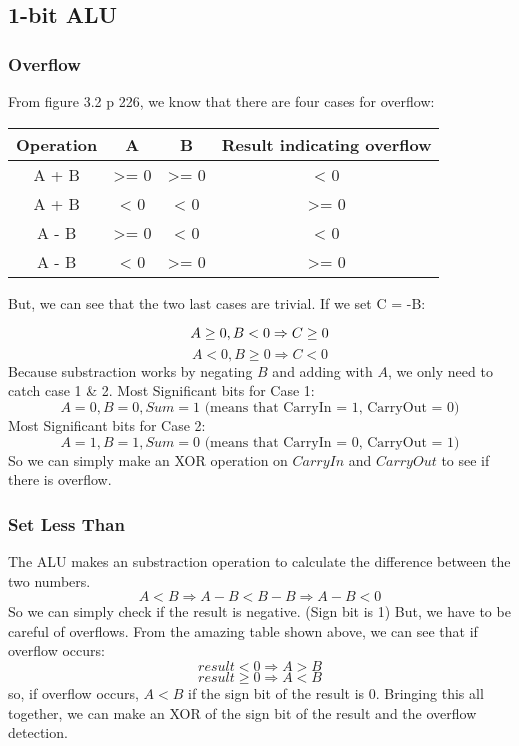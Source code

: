 \documentclass[11pt,a4paper]{article}
\begin{document}

\subsection*{1-bit ALU} %
\label{sub:1-bit_ALU}

\subsubsection*{Overflow}

From figure 3.2 p 226, we know that there are four cases for overflow:
\begin{table}[htb!]
    \centering
    \begin{tabular}{| c | c | c | c |}
        Operation & A & B & Result indicating overflow \\ \hline
        A + B & >= 0 & >= 0 & < 0 \\
        A + B & < 0 & < 0 & >= 0 \\
        A - B & >= 0 & < 0 & < 0 \\
        A - B & < 0 & >= 0 & >= 0 \\
    \end{tabular}
\end{table}

But, we can see that the two last cases are trivial. If we set C = -B:

\[
    A \geq 0, B < 0 \Rightarrow C \geq 0 \\
\]
\[
    A < 0, B \geq 0 \Rightarrow C < 0
\]
Because substraction works by negating $B$ and adding with $A$, we only need to
catch case 1 \& 2. Most Significant bits for Case 1:
\[
    A = 0, B = 0, Sum = 1 \text{ (means that CarryIn = 1, CarryOut = 0)}
\]
Most Significant bits for Case 2:
\[
    A = 1, B = 1, Sum = 0 \text{ (means that CarryIn = 0, CarryOut = 1)}
\]
So we can simply make an XOR operation on $CarryIn$ and $CarryOut$ to see if
there is overflow.

\subsubsection*{Set Less Than}
The ALU makes an substraction operation to calculate the difference between the
two numbers.
\[
    A < B \Rightarrow A - B < B - B \Rightarrow A - B < 0
\]
So we can simply check if the result is negative. (Sign bit is 1) But, we have
to be careful of overflows. From the amazing table shown above, we can see that
if overflow occurs:
\[
    result < 0 \Rightarrow A > B
\]
\[
    result \geq 0 \Rightarrow A < B
\]
so, if overflow occurs, $A < B$ if the sign bit of the result is 0. Bringing
this all together, we can make an XOR of the sign bit of the result and the
overflow detection.
\end{document}
